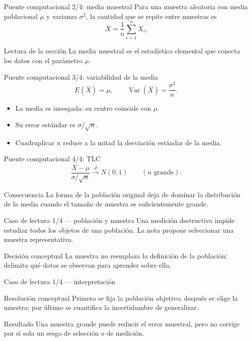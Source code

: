 \documentclass[10pt,aspectratio=169]{beamer}
\begin{document}
\begin{frame}{Puente computacional 2/4: media muestral}
  \footnotesize
  Para una muestra aleatoria con media poblacional $\mu$ y varianza $\sigma^2$,
  la cantidad que se repite entre muestras es
  \[
    \bar X=\frac{1}{n}\sum_{i=1}^{n}X_i.
  \]
  \begin{block}{Lectura de la sección}
    La media muestral es el estadístico elemental que conecta los datos con el
    parámetro $\mu$.
  \end{block}
\end{frame}

\begin{frame}{Puente computacional 3/4: variabilidad de la media}
  \footnotesize
  \[
    E(\bar X)=\mu,\qquad \operatorname{Var}(\bar X)=\frac{\sigma^2}{n}.
  \]
  \begin{itemize}\itemsep=0.13cm
    \item La media es insesgada: su centro coincide con $\mu$.
    \item Su error estándar es $\sigma/\sqrt n$.
    \item Cuadruplicar $n$ reduce a la mitad la desviación estándar de la media.
  \end{itemize}
\end{frame}

\begin{frame}{Puente computacional 4/4: TLC}
  \footnotesize
  \[
    \frac{\bar X-\mu}{\sigma/\sqrt n}\xrightarrow{d}N(0,1)
    \qquad (n\text{ grande}).
  \]
  \begin{block}{Consecuencia}
    La forma de la población original deja de dominar la distribución de la
    media cuando el tamaño de muestra es suficientemente grande.
  \end{block}
\end{frame}

\begin{frame}{Caso de lectura 1/4 --- población y muestra}
  \footnotesize
  Una medición destructiva impide estudiar todos los objetos de una población.
  La nota propone seleccionar una muestra representativa.
  \begin{alertblock}{Decisión conceptual}
    La muestra no reemplaza la definición de la población: delimita qué datos
    se observan para aprender sobre ella.
  \end{alertblock}
\end{frame}

\begin{frame}{Caso de lectura 1/4 --- interpretación}
  \footnotesize
  \begin{block}{Resolución conceptual}
    Primero se fija la población objetivo; después se elige la muestra; por
    último se cuantifica la incertidumbre de generalizar.
  \end{block}
  \begin{exampleblock}{Resultado}
    Una muestra grande puede reducir el error muestral, pero no corrige por sí
    sola un sesgo de selección o de medición.
  \end{exampleblock}
\end{frame}
\end{document}
